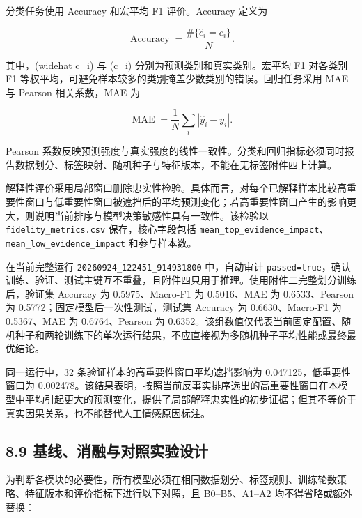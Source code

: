 \documentclass[
  12pt,
  a4paper,
]{ctexart}
\begin{document}
分类任务使用 Accuracy 和宏平均 F1 评价。Accuracy 定义为

\[
\operatorname{Accuracy}=\frac{\#\{\widehat c_i=c_i\}}{N}.
\]

其中，(widehat c\_i) 与 (c\_i) 分别为预测类别和真实类别。宏平均 F1
对各类别 F1
等权平均，可避免样本较多的类别掩盖少数类别的错误。回归任务采用 MAE 与
Pearson 相关系数，MAE 为

\[
\operatorname{MAE}=\frac1N\sum_i|\widehat y_i-y_i|.
\]

Pearson
系数反映预测强度与真实强度的线性一致性。分类和回归指标必须同时报告数据划分、标签映射、随机种子与特征版本，不能在无标签附件四上计算。

解释性评价采用局部窗口删除忠实性检验。具体而言，对每个已解释样本比较高重要性窗口与低重要性窗口被遮挡后的平均预测变化；若高重要性窗口产生的影响更大，则说明当前排序与模型决策敏感性具有一致性。该检验以
\texttt{fidelity\_metrics.csv} 保存，核心字段包括
\texttt{mean\_top\_evidence\_impact}、\texttt{mean\_low\_evidence\_impact}
和参与样本数。

在当前完整运行 \texttt{20260924\_122451\_914931800} 中，自动审计
\texttt{passed=true}，确认训练、验证、测试主键互不重叠，且附件四只用于推理。使用附件二完整划分训练后，验证集
Accuracy 为 0.5975、Macro-F1 为 0.5016、MAE 为 0.6533、Pearson 为
0.5772；固定模型后一次性测试，测试集 Accuracy 为 0.6630、Macro-F1 为
0.5367、MAE 为 0.6764、Pearson 为
0.6352。该组数值仅代表当前固定配置、随机种子和两轮训练下的单次运行结果，不应直接视为多随机种子平均性能或最终最优结论。

同一运行中，32 条验证样本的高重要性窗口平均遮挡影响为
0.047125，低重要性窗口为
0.002478。该结果表明，按照当前反事实排序选出的高重要性窗口在本模型中平均引起更大的预测变化，提供了局部解释忠实性的初步证据；但其不等价于真实因果关系，也不能替代人工情感原因标注。

\hypertarget{ux57faux7ebfux6d88ux878dux4e0eux5bf9ux7167ux5b9eux9a8cux8bbeux8ba1}{%
\subsection{8.9
基线、消融与对照实验设计}\label{ux57faux7ebfux6d88ux878dux4e0eux5bf9ux7167ux5b9eux9a8cux8bbeux8ba1}}

为判断各模块的必要性，所有模型必须在相同数据划分、标签规则、训练轮数策略、特征版本和评价指标下进行以下对照，且
B0--B5、A1--A2 均不得省略或额外替换：
\end{document}
